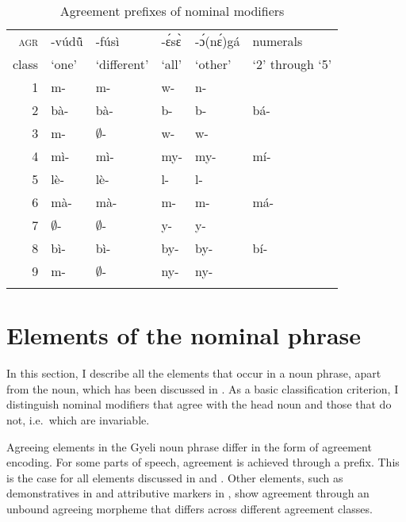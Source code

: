 \begin{table}[b]%
\begin{tabularx}{\textwidth}{r@{\qquad\qquad}XlXll}
 \lsptoprule
\textsc{agr}  & 	-vúdũ̂ 	& 	-fúsì        &  	-ɛ́sɛ̀	& -ɔ́(nɛ́)gá	  & numerals  \\
class & 	`one' 	& 	`different'  &  `all'	       & `other'	  & `2' through `5'  \\
 \midrule
1 & 	m- 		& 	m-	& 	w-		&      n- 	&  	 \\
2 & 	bà- 		& 	bà-	& 	b-		&      b- 	& bá-	 \\
3 & 	m- 		& 	$\emptyset$- 	& w-		& 	w-  	& 	 \\
4 & 	mì- 		& 	mì-	& 	my-		& 	my- 	& mí- 	\\
5 & 	lè- 		& 	lè-	& 	l-		&      l- 	&  	\\
6 & 	mà-  		& 	mà-	& 	m-		&      m- 	 & má-	\\
7 & 	$\emptyset$- 	& $\emptyset$- & y- &     y- 	 &  	\\
8 & 	bì- 		& 	bì-	& 	by-		&     by- 	& bí- 	 \\
9 & 	m- 		& $\emptyset$-& ny-	&     ny- 	 &  	\\
 \lspbottomrule
\end{tabularx}
\caption{Agreement prefixes of nominal modifiers}
\label{Tab:DEICMOD}
\end{table}




\section{Elements of the nominal phrase}
\label{sec:NAdjuncts}

In this section, I describe all the elements that occur in a noun phrase, apart from the noun, which has been discussed in . As a basic classification criterion, I distinguish nominal modifiers that agree with the head noun and those that do not, i.e.\ which are invariable.  
	
	

Agreeing elements in the Gyeli noun phrase differ in the form of agreement encoding. For some parts of speech, agreement is achieved through a prefix. This is the case for all elements discussed in  and . Other elements, such  as demonstratives in  and attributive markers in , show agreement through an unbound agreeing morpheme that differs across different agreement classes.

